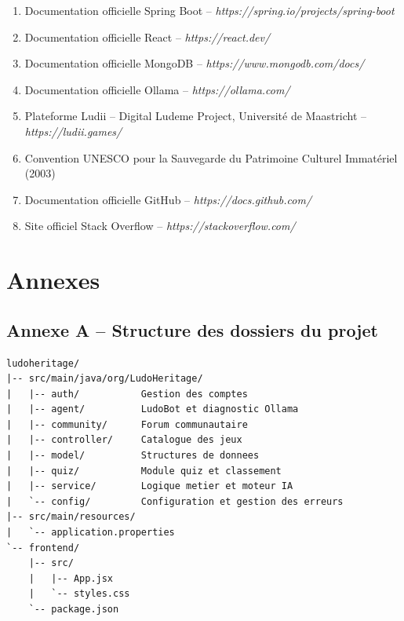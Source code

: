 \documentclass[12pt,a4paper]{report}
\begin{document}
\begin{enumerate}
  \item Documentation officielle Spring Boot -- \textit{https://spring.io/projects/spring-boot}
  \item Documentation officielle React -- \textit{https://react.dev/}
  \item Documentation officielle MongoDB -- \textit{https://www.mongodb.com/docs/}
  \item Documentation officielle Ollama -- \textit{https://ollama.com/}
  \item Plateforme Ludii -- Digital Ludeme Project, Université de Maastricht -- \textit{https://ludii.games/}
  \item Convention UNESCO pour la Sauvegarde du Patrimoine Culturel Immatériel (2003)
  \item Documentation officielle GitHub -- \textit{https://docs.github.com/}
  \item Site officiel Stack Overflow -- \textit{https://stackoverflow.com/}
\end{enumerate}

\newpage
\chapter*{Annexes}
\thispagestyle{fancy}

\section*{Annexe A -- Structure des dossiers du projet}

\begin{verbatim}
ludoheritage/
|-- src/main/java/org/LudoHeritage/
|   |-- auth/           Gestion des comptes
|   |-- agent/          LudoBot et diagnostic Ollama
|   |-- community/      Forum communautaire
|   |-- controller/     Catalogue des jeux
|   |-- model/          Structures de donnees
|   |-- quiz/           Module quiz et classement
|   |-- service/        Logique metier et moteur IA
|   `-- config/         Configuration et gestion des erreurs
|-- src/main/resources/
|   `-- application.properties
`-- frontend/
    |-- src/
    |   |-- App.jsx
    |   `-- styles.css
    `-- package.json
\end{verbatim}
\end{document}
